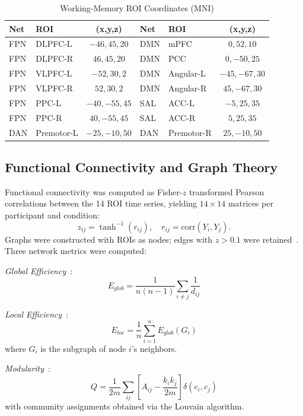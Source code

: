 \documentclass[conference]{IEEEtran}
\begin{document}
\begin{table}[t]
\caption{Working-Memory ROI Coordinates (MNI)}
\label{tab:roi}
\centering
\footnotesize
\setlength{\tabcolsep}{3pt}
\begin{tabular}{@{}llc|llc@{}}
\toprule
\textbf{Net} & \textbf{ROI} & \textbf{(x,y,z)} & \textbf{Net} & \textbf{ROI} & \textbf{(x,y,z)} \\
\midrule
FPN & DLPFC-L & $-46,45,20$ & DMN & mPFC & $0,52,10$ \\
FPN & DLPFC-R & $46,45,20$ & DMN & PCC & $0,-50,25$ \\
FPN & VLPFC-L & $-52,30,2$ & DMN & Angular-L & $-45,-67,30$ \\
FPN & VLPFC-R & $52,30,2$ & DMN & Angular-R & $45,-67,30$ \\
FPN & PPC-L & $-40,-55,45$ & SAL & ACC-L & $-5,25,35$ \\
FPN & PPC-R & $40,-55,45$ & SAL & ACC-R & $5,25,35$ \\
DAN & Premotor-L & $-25,-10,50$ & DAN & Premotor-R & $25,-10,50$ \\
\bottomrule
\end{tabular}
\end{table}

\subsection{Functional Connectivity and Graph Theory}
Functional connectivity was computed as Fisher-$z$ transformed Pearson correlations between the 14 ROI time series, yielding $14 \times 14$ matrices per participant and condition:
\begin{equation}
z_{ij} = \tanh^{-1}(r_{ij}), \quad r_{ij} = \mathrm{corr}(Y_i, Y_j).
\end{equation}
Graphs were constructed with ROIs as nodes; edges with $z>0.1$ were retained~\cite{rubinov2010complex}. Three network metrics were computed:

\emph{Global Efficiency}~\cite{latora2001efficient}:
\begin{equation}
E_{glob} = \frac{1}{n(n-1)} \sum_{i \neq j} \frac{1}{d_{ij}}
\end{equation}

\emph{Local Efficiency}~\cite{latora2001efficient}:
\begin{equation}
E_{loc} = \frac{1}{n} \sum_{i=1}^{n} E_{glob}(G_i)
\end{equation}
where $G_i$ is the subgraph of node $i$'s neighbors.

\emph{Modularity}~\cite{newman2006modularity}:
\begin{equation}
Q = \frac{1}{2m} \sum_{ij} \left[A_{ij} - \frac{k_i k_j}{2m}\right] \delta(c_i, c_j)
\end{equation}
with community assignments obtained via the Louvain algorithm.
\end{document}

